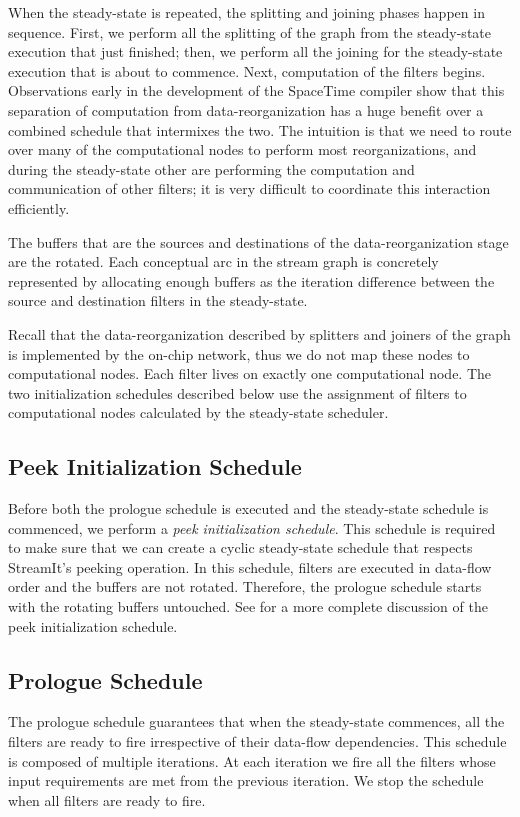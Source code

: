 When the steady-state is repeated, the splitting and joining phases
happen in sequence.  First, we perform all the splitting of the graph
from the steady-state execution that just finished; then, we perform
all the joining for the steady-state execution that is about to
commence. Next, computation of the filters begins.  Observations early
in the development of the SpaceTime compiler show that this separation
of computation from data-reorganization has a huge benefit over a
combined schedule that intermixes the two.  The intuition is that we
need to route over many of the computational nodes to perform most
reorganizations, and during the steady-state other are performing the
computation and communication of other filters; it is very difficult to
coordinate this interaction efficiently.

The buffers that are the sources and destinations of the
data-reorganization stage are the rotated.  Each conceptual arc in the
stream graph is concretely represented by allocating enough buffers as
the iteration difference between the source and destination filters in
the steady-state.


Recall that the data-reorganization described by splitters and joiners
of the graph is implemented by the on-chip network, thus we do not map
these nodes to computational nodes.  Each filter lives on exactly one
computational node.  The two initialization schedules described below
use the assignment of filters to computational nodes calculated by the
steady-state scheduler.

\subsection{Peek Initialization Schedule}
Before both the prologue schedule is executed and the steady-state
schedule is commenced, we perform a {\it peek initialization
schedule}.  This schedule is required to make sure that we can create
a cyclic steady-state schedule that respects StreamIt's peeking
operation.  In this schedule, filters are executed in data-flow order
and the buffers are not rotated.  Therefore, the prologue schedule
starts with the rotating buffers untouched.  See
\cite{streamitcc} for a more complete discussion of the peek
initialization schedule.

\subsection{Prologue Schedule}
The prologue schedule guarantees that when the steady-state commences,
all the filters are ready to fire irrespective of their data-flow
dependencies.  This schedule is composed of multiple iterations.  At
each iteration we fire all the filters whose input requirements are met
from the previous iteration.  We stop the schedule when all filters are
ready to fire.

